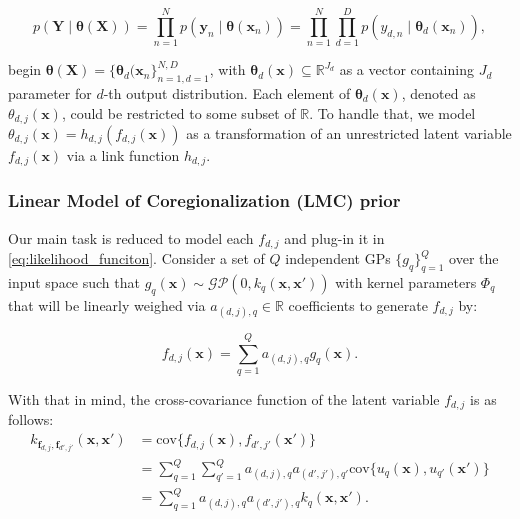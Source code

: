 \begin{equation}\label{eq:likelihood_funciton}
	p(\boldsymbol{Y} \mid \boldsymbol{\theta}(\boldsymbol{X})) = \prod_{n=1}^N p\left(\boldsymbol{y}_n \mid \boldsymbol{\theta}(\boldsymbol{x}_n)\right) = \prod_{n=1}^N \prod_{d=1}^D p\left(y_{d,n} \mid \boldsymbol{\theta}_d(\boldsymbol{x}_n)\right), 
\end{equation}

begin \( \boldsymbol{\theta}(\boldsymbol{X}) = \{ \boldsymbol{\theta}_d(\boldsymbol{x}_n \}_{n=1,d=1}^{N, D} \), with \( \boldsymbol{\theta}_d(\boldsymbol{x}) \subseteq \mathbb{R}^{J_d} \) as a vector containing \( J_d \) parameter for \( d \)-th output distribution. Each element of \( \boldsymbol{\theta}_d(\boldsymbol{x}) \), denoted as \( \theta_{d,j}(\boldsymbol{x}) \), could be restricted to some subset of \( \mathbb{R} \). To handle that, we model \( \theta_{d,j}(\boldsymbol{x}) = h_{d,j}(f_{d,j}(\boldsymbol{x})) \) as a transformation of an unrestricted latent variable \( f_{d,j}(\boldsymbol{x}) \) via a link function \( h_{d,j} \).

\subsubsection{Linear Model of Coregionalization (LMC) prior}

Our main task is reduced to model each \(f_{d,j}\) and plug-in it in \cref{eq:likelihood_funciton}. Consider a set of \( Q \) independent GPs \( \{ g_q \}_{q=1}^Q \) over the input space such that \( g_q(\boldsymbol{x}) \sim \mathcal{GP}(0, k_q(\boldsymbol{x}, \boldsymbol{x}'))\) with kernel parameters \( \Phi_q \) that will be linearly weighed via \( a_{(d,j),q} \in \mathbb{R} \) coefficients to generate \( f_{d,j} \) by:

\begin{equation}\label{eq:lmc_process}
	f_{d,j}(\boldsymbol{x}) = \sum_{q=1}^Q a_{(d,j),q} g_{q}(\boldsymbol{x}).
\end{equation}

With that in mind, the cross-covariance function of the latent variable \( f_{d,j} \) is as follows:
\begin{equation}
	\begin{split}\label{eq:cross-covariance_function}
		k_{\boldsymbol{f}_{d,j}, \boldsymbol{f}_{d',j'}}(\boldsymbol{x}, \boldsymbol{x}') &= \text{cov}\{f_{d,j}(\boldsymbol{x}), f_{d',j'}(\boldsymbol{x}')\}\\
		&=\sum_{q=1}^Q \sum_{q'=1}^Q a_{(d,j),q}a_{(d',j'),q'}\text{cov}\{u_{q}(\boldsymbol{x}), u_{q'}(\boldsymbol{x}')\}\\
		&=\sum_{q=1}^Q a_{(d,j),q}a_{(d',j'),q} k_{q}(\boldsymbol{x}, \boldsymbol{x}').
	\end{split}
\end{equation}


